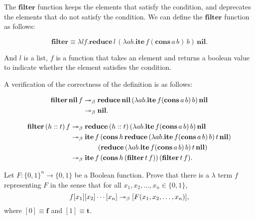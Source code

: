 \documentclass{homework}
\begin{document}
\begin{solution}

  The $\mathbf{filter}$ function keeps the elements that satisfy the condition,
  and deprecates the elements that do not satisfy the condition.
  We can define the $\mathbf{filter}$ function as follows:

  \begin{equation*}
    \mathbf{filter} \equiv \lambda lf. \mathbf{reduce}\, l\,
    (\lambda ab. \mathbf{ite}\, f (\mathbf{cons}\, a \, b)\, b)\, \mathbf{nil}.
  \end{equation*}

  And $l$ is a list, $f$ is a function that
  takes an element and returns a boolean value to indicate
  whether the element satisfies the condition.

  A verification of the correctness of the definition is as follows:

  \begin{align*}
    \mathbf{filter}\, \mathbf{nil}\, f & \twoheadrightarrow_{\beta} \mathbf{reduce}\, \mathbf{nil}\, (\lambda ab. \mathbf{ite}\, f (\mathbf{cons}\, a \, b)\, b)\, \mathbf{nil} \\
    & \twoheadrightarrow_{\beta} \mathbf{nil}.
  \end{align*}

  \begin{align*}
    \mathbf{filter}\, (h::t)\, f & \twoheadrightarrow_{\beta} \mathbf{reduce}\, (h::t)\, (\lambda ab. \mathbf{ite}\, f (\mathbf{cons}\, a \, b)\, b)\, \mathbf{nil} \\
    & \twoheadrightarrow_{\beta} \mathbf{ite}\, f\, (\mathbf{cons}\, h\, \mathbf{reduce}\, (\lambda ab. \mathbf{ite}\, f (\mathbf{cons}\, a \, b)\, b)\, t\, \mathbf{nil}) \\
    & \qquad\qquad (\mathbf{reduce}\, (\lambda ab. \mathbf{ite}\, f (\mathbf{cons}\, a \, b)\, b)\, t\, \mathbf{nil}) \\
    & \twoheadrightarrow_{\beta} \mathbf{ite}\, f\, (\mathbf{cons}\, h\, (\mathbf{filter}\, t\, f))\, (\mathbf{filter}\, t\, f).
  \end{align*}

\end{solution}

\begin{problem}
  Let $F : {\{0,1\}}^{n} \to \{0,1\}$ be a Boolean function.
  Prove that there is a $\lambda$ term $f$ representing $F$ in the sense that
  for all $x_{1}, x_{2}, \ldots, x_{n} \in \{0,1\}$,
  \begin{equation*}
    f [x_{1}] [x_{2}] \cdots [x_{n}] \twoheadrightarrow_{\beta} [F(x_{1}, x_{2}, \ldots, x_{n})],
  \end{equation*}
  where $[0] \equiv \mathbf{f}$ and $[1] \equiv \mathbf{t}$.
\end{problem}
\end{document}
